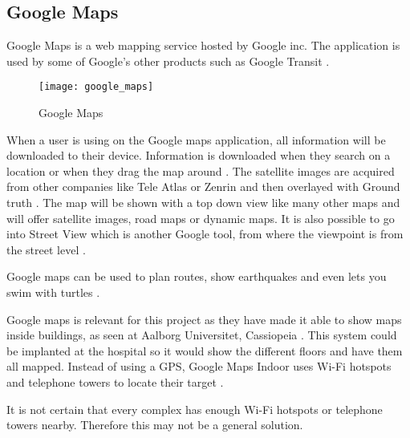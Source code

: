 \subsection{Google Maps}
Google Maps is a web mapping service hosted by Google inc. The application is used by some of Google's other products such as Google Transit  \cite{Goo_transist}. 

\begin{figure}[ht!]
    \centering
    \texttt{[image: google\_maps]}
    \caption{Google Maps}
    \label{fig:google_maps}
  \end{figure}

When a user is using on the Google maps application, all information will be downloaded to their device. Information is downloaded when they search on a location or when they drag the map around  \cite{Goo_input}. The satellite images are acquired from other companies like Tele Atlas \cite{Goo_Tele} or Zenrin \cite{Goo_Zenrin} and then overlayed with Ground truth \cite{Goo_GT}.
The map will be shown with a top down view like many other maps and will offer satellite images, road maps or dynamic maps. It is also possible to go into Street View which is another Google tool, from where the viewpoint is from the street level \cite{Goo_street}.

Google maps can be used to plan routes, show earthquakes and even lets you swim with turtles \cite{Goo_Turtle}.

Google maps is relevant for this project as they have made it able to show maps inside buildings, as seen at Aalborg Universitet, Cassiopeia \cite{Goo_Indoor1}. This system could be implanted at the hospital so it would show the different floors and have them all mapped. Instead of using a GPS, Google Maps Indoor uses Wi-Fi hotspots and telephone towers to locate their target \cite{Goo_Indoor}.

It is not certain that every complex has enough Wi-Fi hotspots or telephone towers nearby. Therefore this may not be a general solution.